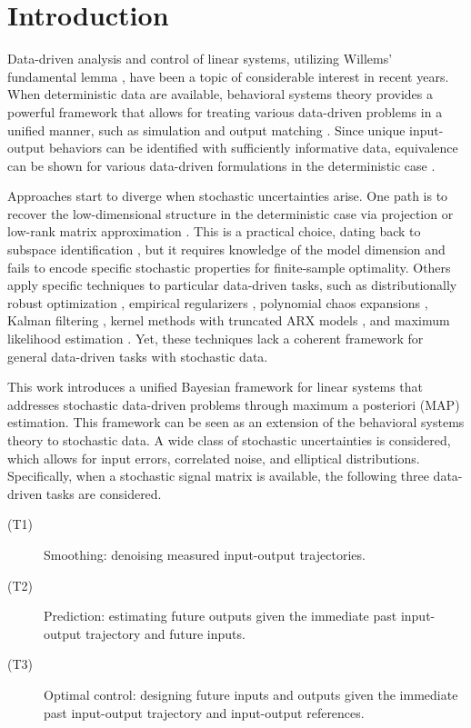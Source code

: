 \documentclass{ifacconf}
\begin{document}
\section{Introduction}

Data-driven analysis and control of linear systems, utilizing Willems' fundamental lemma \citep{Willems_2005}, have been a topic of considerable interest in recent years. When deterministic data are available, behavioral systems theory provides a powerful framework that allows for treating various data-driven problems in a unified manner, such as simulation and output matching \citep{Markovsky_2021, MARKOVSKY2022110008}. Since unique input-output behaviors can be identified with sufficiently informative data, equivalence can be shown for various data-driven formulations in the deterministic case \citep{Coulson_2019,Fiedler_2021}.

Approaches start to diverge when stochastic uncertainties arise. One path is to recover the low-dimensional structure in the deterministic case via projection \citep{Breschi_2023} or low-rank matrix approximation \citep{MARKOVSKY2022110008}. This is a practical choice, dating back to subspace identification \citep{van2012subspace}, but it requires knowledge of the model dimension and fails to encode specific stochastic properties for finite-sample optimality. Others apply specific techniques to particular data-driven tasks, such as distributionally robust optimization \citep{Coulson_2019_reg}, empirical regularizers \citep{dorfler2022bridging,Coulson_2019}, polynomial chaos expansions \citep{9999463}, Kalman filtering \citep{10886852,YIN202479}, kernel methods with truncated ARX models \citep{Chiuso_2025}, and maximum likelihood estimation \citep{yin2020maximum}. Yet, these techniques lack a coherent framework for general data-driven tasks with stochastic data.

This work introduces a unified Bayesian framework for linear systems that addresses stochastic data-driven problems through maximum a posteriori (MAP) estimation. This framework can be seen as an extension of the behavioral systems theory to stochastic data. A wide class of stochastic uncertainties is considered, which allows for input errors, correlated noise, and elliptical distributions. Specifically, when a stochastic signal matrix is available, the following three data-driven tasks are considered.
\begin{description}
    \item[(T1)]Smoothing: denoising measured input-output trajectories.
    \item[(T2)]Prediction: estimating future outputs given the immediate past input-output trajectory and future inputs.
    \item[(T3)]Optimal control: designing future inputs and outputs given the immediate past input-output trajectory and input-output references.
\end{description}
\end{document}
